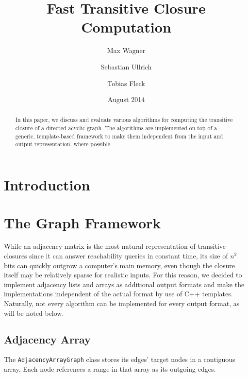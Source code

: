 \documentclass[12pt,a4paper,twoside]{article}
\begin{document}
\title{Fast Transitive Closure Computation}
\author{Max Wagner \and Sebastian Ullrich \and Tobias Fleck}
\date{August 2014}
\maketitle

\def\sectionautorefname{Section}
\def\subsectionautorefname{Subsection}

\newcommand\ie{i.e.\ }
\newcommand\eg{e.g.,\ }
\newcommand\credits[1]{\begin{flushright}\emph{#1}\end{flushright}}

\begin{abstract}
  In this paper, we discuss and evaluate various algorithms for computing the transitive closure of a directed acyclic graph. The algorithms are implemented on top of a generic, template-based framework to make them independent from the input and output representation, where possible.
\end{abstract}

\section{Introduction}

\section{The Graph Framework}

While an adjacency matrix is the most natural representation of transitive closures since it can answer reachability queries in constant time, its size of $n^2$ bits can quickly outgrow a computer's main memory, even though the closure itself may be relatively sparse for realistic inputs. For this reason, we decided to implement adjacency lists and arrays as additional output formats and make the implementations independent of the actual format by use of C++ templates. Naturally, not every algorithm can be implemented for every output format, as will be noted below.

\subsection{Adjacency Array}

The \verb|AdjacencyArrayGraph| class stores its edges' target nodes in a contiguous array. Each node references a range in that array as its outgoing edges.
\end{document}
